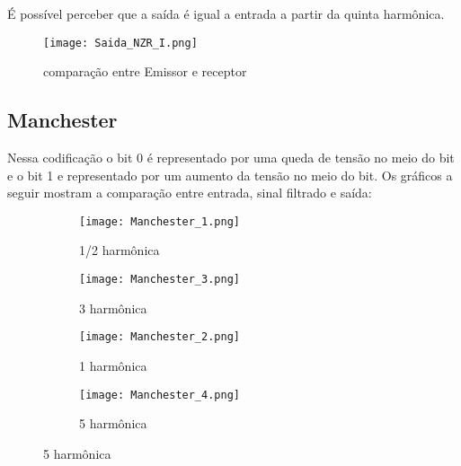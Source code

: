 \documentclass{article}
\begin{document}
            É possível perceber que a saída é igual a entrada a partir da quinta harmônica.
            \begin{figure}[H]
                \begin{center}
                    \texttt{[image: Saida\_NZR\_I.png]}
                    \caption{comparação entre Emissor e receptor}
                    \label{fig:Saida_NZR_I}
                \end{center}
            \end{figure}
        \subsection{Manchester}
            Nessa codificação o bit 0 é representado por uma queda de tensão no meio do bit e o bit 1 e representado por um aumento da tensão no meio do bit. Os gráficos a seguir mostram a comparação entre entrada, sinal filtrado e saída:
            \begin{figure}[H]
                \begin{multicols}{2}
                    \begin{figure}[H]
                        \begin{center}
                            \texttt{[image: Manchester\_1.png]}
                            \caption{1/2 harmônica}
                            \label{fig:Manchester_1}
                        \end{center}
                    \end{figure}
                    \begin{figure}[H]
                        \begin{center}
                            \texttt{[image: Manchester\_3.png]}
                            \caption{3 harmônica}
                            \label{fig:Manchester_3}
                        \end{center}
                    \end{figure}
                    \begin{figure}[H]
                        \begin{center}
                            \texttt{[image: Manchester\_2.png]}
                            \caption{1 harmônica}
                            \label{fig:Manchester_2}
                        \end{center}
                    \end{figure}
                    \begin{figure}[H]
                        \begin{center}
                            \texttt{[image: Manchester\_4.png]}
                            \caption{5 harmônica}
                            \label{fig:Manchester_4}
                        \end{center}
                    \end{figure}
                \end{multicols}
            \end{figure}
\end{document}
